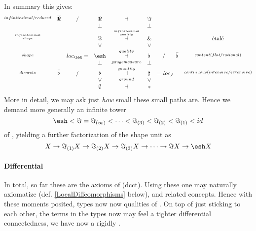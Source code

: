 \documentclass[12pt,titlepage]{article}
\newcommand{\itexarray}[1]{\begin{matrix}#1\end{matrix}}
\newcommand{\lt}{<}
\theoremstyle{plain}
\theoremstyle{definition}
\theoremstyle{remark}
\begin{document}
In summary this gives:
\begin{displaymath}
\itexarray{
\stackrel{infinitesimal/reduced}{} &\overline{\Re} & / & \Re &\dashv& \Im &  &  &
\\
&& & \bot && \bot
\\
\stackrel{infinitesimal \atop shape}{} && & \Im
&\stackrel{infinitesimal \atop quality}{\dashv}& \& & && \text{étalé}
\\
&& & \vee && \vee
\\
\stackrel{shape}{} && loc_{\bbR} =& \esh  &\stackrel{quality}{\dashv}& \flat & / & \overline{\flat}&  \stackrel{content(flat/rational)}{}
\\
&& & \bot &\stackrel{gaugemeasure}{}& \bot
\\
\stackrel{discrete}{} &\overline{\flat}& / & \flat &\stackrel{quantity}{\dashv}& \sharp & = loc_{\not\not}  &   & \stackrel{continuous (intensive/extensive)}{}
\\
&& & \vee &\stackrel{ground}{}& \vee
\\
&& & \emptyset &\dashv& \ast &
}
\end{displaymath}
More in detail, we may ask just \emph{how} small these small paths are. Hence we demand more generally an infinite tower
\begin{displaymath}
\esh 
\lt
\Im
=
\Im_{(\infty)}
\lt
\cdots
\lt
\Im_{(3)}
\lt
\Im_{(2)}
\lt
\Im_{(1)}
\lt
id
\end{displaymath}
of , yielding a further factorization of the shape unit as
\begin{displaymath}
X \to \Im_{(1)}X \to \Im_{(2)}X 
\to \Im_{(3)} X  \to \cdots \to \Im X \to \esh  X
\end{displaymath}
\hypertarget{differential}{}\paragraph*{{Differential}}\label{differential}
In total, so far these are the axioms of  (\hyperlink{dcct}{dcct}). Using these one may naturally axiomatize  (def. \ref{LocalDiffeomorphisms} below),  and related concepts.
Hence with these moments posited, types now now qualities of . On top of just  sticking to each other, the terms in the types now may feel a tighter differential connectedness, we have now a rigidly  .
\end{document}
